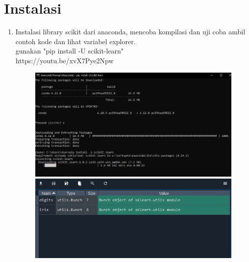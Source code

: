 \section{Instalasi}
\begin{enumerate}
\item
Instalasi library scikit dari anaconda, mencoba kompilasi dan uji coba ambil contoh kode dan lihat variabel explorer.\\
gunakan "pip install -U scikit-learn"\\
https://youtu.be/xvX7Pye2Npw
\begin{figure}[!htbp]
    \centering
    \includegraphics[scale=0.4]{figures/1.JPG}
	\includegraphics[scale=0.4]{figures/1.1.JPG}
    \end{figure}


\end{enumerate}
